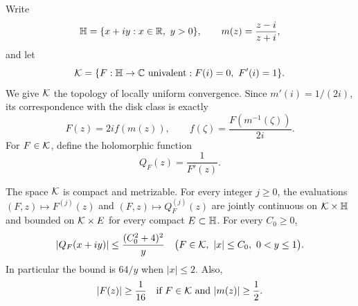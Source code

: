 Write
\[
 \HH=\{x+iy:x\in\mathbb R,\ y>0\},\qquad
 m(z)=\frac{z-i}{z+i},
\]
and let
\[
 \KK=\{F:\HH\to\CC\text{ univalent}:F(i)=0,\ F'(i)=1\}.
\]
We give $\mathcal K$ the topology of locally uniform convergence.  Since
$m'(i)=1/(2i)$, its correspondence with the disk class is exactly
\begin{equation}
 F(z)=2i f(m(z)),\qquad
 f(\zeta)=\frac{F(m^{-1}(\zeta))}{2i}.
 \label{prelim:normalization}
\end{equation}
For $F\in\mathcal K$, define the holomorphic function
\[
 Q_F(z)=\frac1{F'(z)}.
\]

\begin{lemma}
\label{lem:compact-class}
The space $\mathcal K$ is compact and metrizable.  For every integer $j\ge0$,
the evaluations $(F,z)\mapsto F^{(j)}(z)$ and
$(F,z)\mapsto Q_F^{(j)}(z)$ are jointly continuous on $\mathcal K\times\mathbb H$
and bounded on $\mathcal K\times E$ for every compact $E\subset\mathbb H$.
For every $C_0\ge0$,
\begin{equation}
 |Q_F(x+iy)|\le\frac{(C_0^2+4)^2}{y}
 \quad\bigl(F\in\mathcal K,\ |x|\le C_0,\ 0<y\le1\bigr).
 \label{prelim:strip-bound}
\end{equation}
In particular the bound is $64/y$ when $|x|\le2$.  Also,
\begin{equation}
 |F(z)|\ge\frac1{16}
 \quad\text{if }F\in\mathcal K\text{ and }|m(z)|\ge\frac12.
 \label{prelim:zero-separation}
\end{equation}
\end{lemma}

